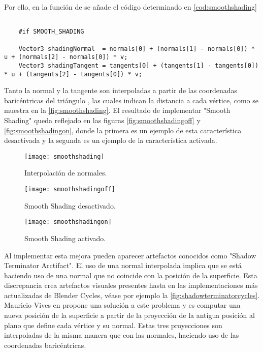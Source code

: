 Por ello, en la función  de  se añade el código determinado en \autoref{cod:smoothshading}

\begin{minipage}[c]{0.95\textwidth}
\begin{lstlisting}[label={cod:smoothshading}, caption={Código interpolación de normales.}]
			
	#if SMOOTH_SHADING 

    Vector3 shadingNormal  = normals[0] + (normals[1] - normals[0]) * u + (normals[2] - normals[0]) * v;
    Vector3 shadingTangent = tangents[0] + (tangents[1] - tangents[0]) * u + (tangents[2] - tangents[0]) * v;

\end{lstlisting}
\end{minipage}
	
Tanto la normal y la tangente son interpoladas a partir de las coordenadas baricéntricas del triángulo , las cuales indican la distancia a cada vértice, como se muestra en la \autoref{fig:smoothshading}. El resultado de implementar "Smooth Shading" queda reflejado en las figuras \autoref{fig:smoothshadingoff} y \autoref{fig:smoothshadingon}, donde la primera es un ejemplo de esta característica desactivada y la segunda es un ejemplo de la característica activada.
	
\begin{figure}[H]
    \centering
	\texttt{[image: smoothshading]}
	\caption{Interpolación de normales.}
	\label{fig:smoothshading}
\end{figure}

\begin{figure}[H]
		\centering
		\begin{minipage}[b]{0.4\textwidth}
		\texttt{[image: smoothshadingoff]}
		\caption{Smooth Shading desactivado.}
		\label{fig:smoothshadingoff}
	  \end{minipage}
	  \hfill
	  \begin{minipage}[b]{0.4\textwidth}
		\texttt{[image: smoothshadingon]}
		\caption{Smooth Shading activado.}
		\label{fig:smoothshadingon}
	  \end{minipage}
	  	\hfill
\end{figure}


Al implementar esta mejora pueden aparecer artefactos conocidos como "Shadow Terminator Arctifact". El uso de una normal interpolada implica que se está haciendo uso de una normal que no coincide con la posición de la superficie. Esta discrepancia crea artefactos visuales presentes hasta en las implementaciones más actualizadas de Blender Cycles, véase por ejemplo la \autoref{fig:shadowterminatorcycles}. Mauricio Vives en \cite{shadowterminatorrepo} propone una solución a este problema y es computar una nueva posición de la superficie a partir de la proyección de la antigua posición al plano que define cada vértice y su normal. Estas tres proyecciones son interpoladas de la misma manera que con las normales, haciendo uso de las coordenadas baricéntricas.
	

